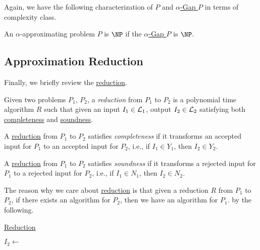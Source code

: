 Again, we have the following characterization of \(P\) and \hyperref[def:Gap]{\(\alpha \)-Gap \(P\)} in terms of complexity class.

\begin{definition}
	An \(\alpha \)-approximating problem \(P\) is \(\NP\) if the \hyperref[def:Gap]{\(\alpha \)-Gap \(P\)} is \(\NP\).
\end{definition}

\subsection{Approximation Reduction}
Finally, we briefly review the \hyperref[def:reduction]{reduction}.

\begin{prev}[Reduction]
	Given two problems \(P_1\), \(P_2\), a \emph{reduction} from \(P_1\) to \(P_2\) is a polynomial time algorithm \(R\) such that given an input \(I_1\in \mathcal{\MakeUppercase{l}}_1 \), output \(I_2\in \mathcal{\MakeUppercase{l}} _2\) satisfying both \hyperref[def:completeness]{completeness} and \hyperref[def:soundness]{soundness}.
	\begin{prev}[Completeness]
		A \hyperref[def:reduction]{reduction} from \(P_1\) to \(P_2\) satisfies \emph{completeness} if it transforms an accepted input for \(P_1\) to an accepted input for \(P_2\), i.e., if \(I_1\in Y_1\), then \(I_2\in Y_2\).
	\end{prev}
	\begin{prev}[Soundness]
		A \hyperref[def:reduction]{reduction} from \(P_1\) to \(P_2\) satisfies \emph{soundness} if it transforms a rejected input for \(P_1\) to a rejected input for \(P_2\), i.e., if \(I_1\in N_1\), then \(I_2\in N_2\).
	\end{prev}
\end{prev}

The reason why we care about \hyperref[def:reduction]{reduction} is that given a reduction \(R\) from \(P_1\) to \(P_2\), if there exists an algorithm for \(P_2\), then we have an algorithm for \(P_1\). by the following.

\begin{algorithm}[H]\label{algo:reduction}
	\DontPrintSemicolon
	\caption{\hyperref[def:reduction]{Reduction}}
	\BlankLine
	\(I_2\gets\)\;
\end{algorithm}

